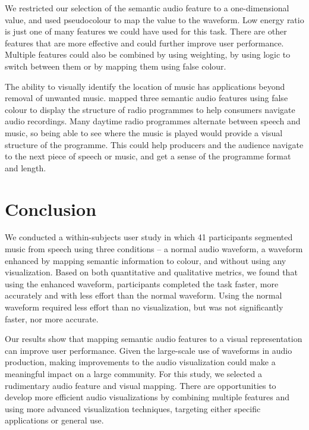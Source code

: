 We restricted our selection of the semantic audio feature to a one-dimensional value, and used pseudocolour to map the
value to the waveform.  Low energy ratio is just one of many features we could have used for this task.  There are
other features that are more effective and could further improve user performance. Multiple features could
also be combined by using weighting, by using logic to switch between them or by mapping them using false colour.

The ability to visually identify the location of music has applications beyond removal of unwanted music.
\citet{Mason2007} mapped three semantic audio features using false colour to display the structure of radio programmes
to help consumers navigate audio recordings.  Many daytime radio programmes alternate between speech and music, so
being able to see where the music is played would provide a visual structure of the programme. This could help
producers and the audience navigate to the next piece of speech or music, and get a sense of the programme format and
length.

\section{Conclusion}\label{sec:vis-conclusions}

We conducted a within-subjects user study in which 41 participants segmented music from speech using three conditions
-- a normal audio waveform, a waveform enhanced by mapping semantic information to colour, and without using any
visualization.  Based on both quantitative and qualitative metrics, we found that using the enhanced waveform,
participants completed the task faster, more accurately and with less effort than the normal waveform. Using the normal
waveform required less effort than no visualization, but was not significantly faster, nor more accurate.

Our results show that mapping semantic audio features to a visual representation can improve user performance.  Given
the large-scale use of waveforms in audio production, making improvements to the audio visualization could make a
meaningful impact on a large community.  For this study, we selected a rudimentary audio feature and visual mapping.
There are opportunities to develop more efficient audio visualizations by combining multiple features and using more
advanced visualization techniques, targeting either specific applications or general use.

